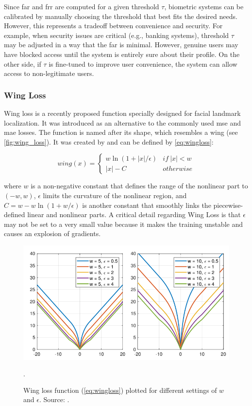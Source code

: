Since \acs{far} and \acs{frr} are computed for a given threshold $\tau$, biometric systems can be calibrated by manually choosing the threshold that best fits the desired needs. However, this represents a tradeoff between convenience and security. For example, when security issues are critical (e.g., banking systems), threshold $\tau$ may be adjusted in a way that the \acs{far} is minimal. However, genuine users may have blocked access until the system is entirely sure about their profile. On the other side, if $\tau$ is fine-tuned to improve user convenience, the system can allow access to non-legitimate users.

\subsubsection{Wing Loss} \label{sec:wingloss}

Wing loss is a recently proposed function specially designed for facial landmark localization. It was introduced as an alternative to the commonly used \acs{mse} and \acs{mae} losses. The function is named after its shape, which resembles a wing (see \autoref{fig:wing_loss}). It was created by \citep{wingloss} and can be defined by \autoref{eq:wingloss}: 

\begin{equation}
\label{eq:wingloss}
wing(x) = \begin{cases}
w\ln(1 + \left | x \right | / \epsilon) & if\ \left | x \right | < w\\ 
\left | x \right | - C & otherwise 
\end{cases}
\end{equation}

\noindent
where $w$ is a non-negative constant that defines the range of the nonlinear part to $(-w, w)$, $\epsilon$ limits the curvature of the nonlinear region, and $C = w - w\ln(1 + w / \epsilon)$ is another constant that smoothly links the piecewise-defined linear and nonlinear parts. A critical detail regarding Wing Loss is that $\epsilon$ may not be set to a very small value because it makes the training unstable and causes an explosion of gradients.

\begin{figure}[htb]
\centering
\includegraphics[width=0.8\linewidth]{images/metrics/wing_loss.png}
\caption{Wing loss function (\autoref{eq:wingloss}) plotted for different settings of $w$ and $\epsilon$. Source: \citep{wingloss}.}.
\label{fig:wing_loss}
\end{figure}

